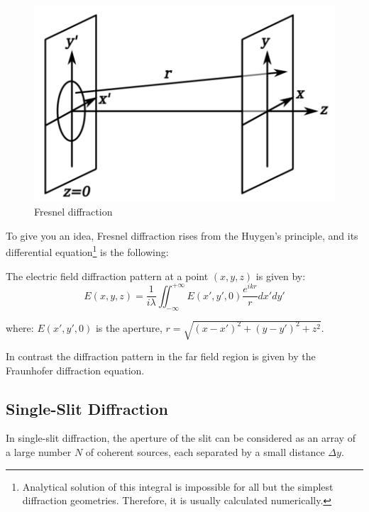 \documentclass[openany]{book}
\begin{document}
\begin{figure}[H]
\centering
\label{fig:Fresnel diffraction}
\includegraphics[scale=0.6]{Figure/24.PNG}
\caption{Fresnel diffraction}
\end{figure}

To give you an idea, Fresnel diffraction rises from the Huygen's principle, and its differential equation\footnote{Analytical solution of this integral is impossible for all but the simplest diffraction geometries. Therefore, it is usually calculated numerically.} is the following:

The electric field diffraction pattern at a point $(x, y, z)$ is given by:
\[{\displaystyle E\left(x,y,z\right)={\frac {1}{i\lambda }}\iint _{-\infty }^{+\infty }{E\left(x',y',0\right){\frac {e^{ikr}}{r}}}dx'dy'}\]

where: $E(x',y',0)$ is the aperture, $r =\sqrt{(x-x')^2+(y-y')^2+z^2}$.

In contrast the diffraction pattern in the far field region is given by the Fraunhofer diffraction equation.
\subsection{Single-Slit Diffraction}
In single-slit diffraction, the aperture of the slit can be considered as an array of a large number $N$ of coherent sources, each separated by a small distance $\Delta y$.
\end{document}
